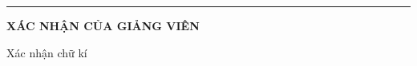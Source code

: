 \newpage

\noindent\rule{\linewidth}{0.4pt}

\begin{center}
    \textbf{XÁC NHẬN CỦA GIẢNG VIÊN}
\end{center}

\vspace{10cm}

\begin{flushright}
    Xác nhận chữ kí
\end{flushright}